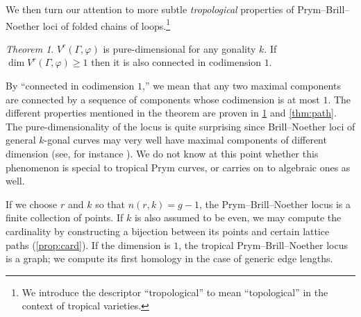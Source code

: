\documentclass[11pt,reqno]{amsart}
\newcommand{\caelan}[1]{\textcolor{orange}{\sf C: [#1]}}
\newcommand{\steven}[1]{\textcolor{pink}{\sf S: [#1]}}
\theoremstyle{definition}
\theoremstyle{problem}
\theoremstyle{plain}
\theoremstyle{remark}
\theoremstyle{theorem}
\newtheorem{maintheorem}{Theorem}
\numberwithin{equation}{section}
\numberwithin{figure}{section}
\begin{document}



We then turn our attention to more subtle \emph{tropological}
properties of Prym--Brill--Noether loci of folded chains of
loops.\footnote{We introduce the descriptor ``tropological'' to mean
  ``topological'' in the context of tropical varieties.} %


\begin{maintheorem}\label{thm:pure-dim}
  $V^r(\Gamma,\varphi)$ is pure-dimensional for any gonality $k$. If
  $\dim V^r(\Gamma,\varphi)\geq 1$ then it is also connected in
  codimension $1$.
\end{maintheorem}

\noindent By ``connected in codimension $1$,'' we mean that any two
maximal components are connected by a sequence of components whose
codimension is at most $1$.  The different properties mentioned in the
theorem are proven in \cref{thm:pure-dim} and \cref{thm:path}.  The
pure-dimensionality of the locus is quite surprising since
Brill--Noether loci of general $k$-gonal curves may very well have
maximal components of different dimension (see, for instance
\cite[Example 2.4]{Cook_Jensen_BN_Components}).  We do not know at
this point whether this phenomenon is special to tropical Prym curves,
or carries on to algebraic ones as well.

If we choose $r$ and $k$ so that $n(r,k) = g - 1$, the
Prym--Brill--Noether locus is a finite collection of points.  If $k$
is also assumed to be even, we may compute the cardinality by
constructing a bijection between its points and certain lattice paths
(\cref{prop:card}).
If the dimension is $1$, the tropical Prym--Brill--Noether locus is a
graph; we compute its first homology in the case of generic edge
lengths. %
\end{document}

